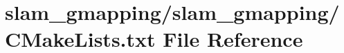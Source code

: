 \hypertarget{slam__gmapping_2slam__gmapping_2CMakeLists_8txt}{}\section{slam\+\_\+gmapping/slam\+\_\+gmapping/\+C\+Make\+Lists.txt File Reference}
\label{slam__gmapping_2slam__gmapping_2CMakeLists_8txt}
